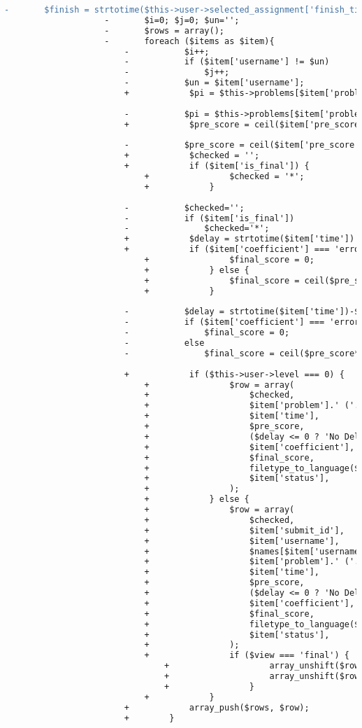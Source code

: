 \begin{lstlisting}[language=diff, caption=Perubahan pada kode Submissions.php]
					-		$finish = strtotime($this->user->selected_assignment['finish_time']);
					-		$i=0; $j=0; $un='';
					-		$rows = array();
					-		foreach ($items as $item){
						-			$i++;
						-			if ($item['username'] != $un)
						-				$j++;
						-			$un = $item['username'];
						+            $pi = $this->problems[$item['problem']];
						
						-			$pi = $this->problems[$item['problem']];
						+            $pre_score = ceil($item['pre_score'] * $pi['score'] / 10000);
						
						-			$pre_score = ceil($item['pre_score']*$pi['score']/10000);
						+            $checked = '';
						+            if ($item['is_final']) {
							+                $checked = '*';
							+            }
						
						-			$checked='';
						-			if ($item['is_final'])
						-				$checked='*';
						+            $delay = strtotime($item['time']) - $finish;
						+            if ($item['coefficient'] === 'error') {
							+                $final_score = 0;
							+            } else {
							+                $final_score = ceil($pre_score * $item['coefficient'] / 100);
							+            }
						
						-			$delay = strtotime($item['time'])-$finish;
						-			if ($item['coefficient'] === 'error')
						-				$final_score = 0;
						-			else
						-				$final_score = ceil($pre_score*$item['coefficient']/100);
						
						+            if ($this->user->level === 0) {
							+                $row = array(
							+                    $checked,
							+                    $item['problem'].' ('.$pi['name'].')',
							+                    $item['time'],
							+                    $pre_score,
							+                    ($delay <= 0 ? 'No Delay' : time_hhmm($delay)),
							+                    $item['coefficient'],
							+                    $final_score,
							+                    filetype_to_language($item['file_type']),
							+                    $item['status'],
							+                );
							+            } else {
							+                $row = array(
							+                    $checked,
							+                    $item['submit_id'],
							+                    $item['username'],
							+                    $names[$item['username']],
							+                    $item['problem'].' ('.$pi['name'].')',
							+                    $item['time'],
							+                    $pre_score,
							+                    ($delay <= 0 ? 'No Delay' : time_hhmm($delay)),
							+                    $item['coefficient'],
							+                    $final_score,
							+                    filetype_to_language($item['file_type']),
							+                    $item['status'],
							+                );
							+                if ($view === 'final') {
								+                    array_unshift($row, $j);
								+                    array_unshift($row, $i);
								+                }
							+            }
						+            array_push($rows, $row);
						+        }
					

\end{lstlisting}
